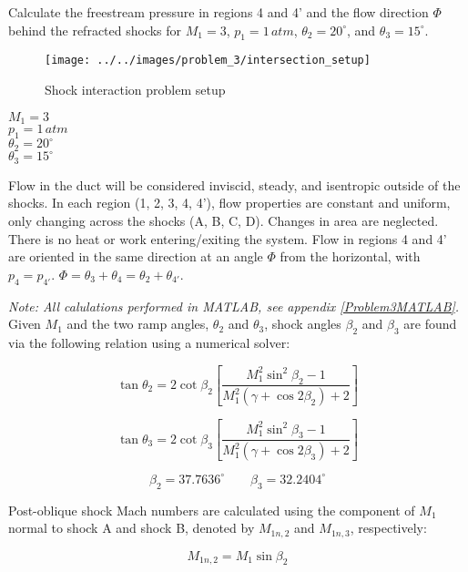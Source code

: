 \documentclass[../main.tex]{subfiles}
\begin{document}

Calculate the freestream pressure in regions 4 and 4' and the flow direction \(\Phi\) behind the refracted shocks for \(M_1=3\), \(p_1 = 1\,\unit{atm}\), \(\theta_2 = 20^\circ\), and \(\theta_3 = 15^\circ\).

\begin{figure}[h!]
    \centering
    \texttt{[image: ../../images/problem\_3/intersection\_setup]}
    \caption{Shock interaction problem setup}
    \label{shock_setup}
\end{figure}

\givens{}
\(M_1 = 3\)\\
\(p_1 = 1\,\unit{atm}\)\\
\(\theta_2 = 20^\circ\)\\
\(\theta_3 = 15^\circ\)\\

\assumptions{}

Flow in the duct will be considered inviscid, steady, and isentropic outside of the shocks.
In each region (1, 2, 3, 4, 4'), flow properties are constant and uniform, only changing across the shocks (A, B, C, D).
Changes in area are neglected.
There is no heat or work entering/exiting the system.
Flow in regions 4 and 4' are oriented in the same direction at an angle \(\Phi\) from the horizontal, with \(p_4 = p_{4'}\).
\(\Phi = \theta_3 + \theta_4 = \theta_2 + \theta_{4'}\).


\solution{}
\textit{Note: All calulations performed in MATLAB, see appendix \ref{Problem3MATLAB}.}\\
Given \(M_1\) and the two ramp angles, \(\theta_2\) and \(\theta_3\), shock angles \(\beta_2\) and \(\beta_3\) are found via the following relation using a numerical solver:

\[
    \tan{\theta_2}
    =
    2 \cot{\beta_2}
    \left[{
    \frac{M_1^2\sin^2{\beta_2}-1}{M_1^2\left({\gamma+\cos{2\beta_2}}\right)+2}
    }\right]
\]

\[
    \tan{\theta_3}
    =
    2 \cot{\beta_3}
    \left[{
    \frac{M_1^2\sin^2{\beta_3}-1}{M_1^2\left({\gamma+\cos{2\beta_3}}\right)+2}
    }\right]
\]

\[
    \boxed{
    \beta_2 = 37.7636^\circ \quad\quad \beta_3 = 32.2404^\circ
    }
\]

Post-oblique shock Mach numbers are calculated using the component of \(M_1\) normal to shock A and shock B, denoted by \(M_{1n,2}\) and \(M_{1n,3}\), respectively:

\[
    M_{1n,2} = M_1 \sin{\beta_2}
\]
\end{document}
